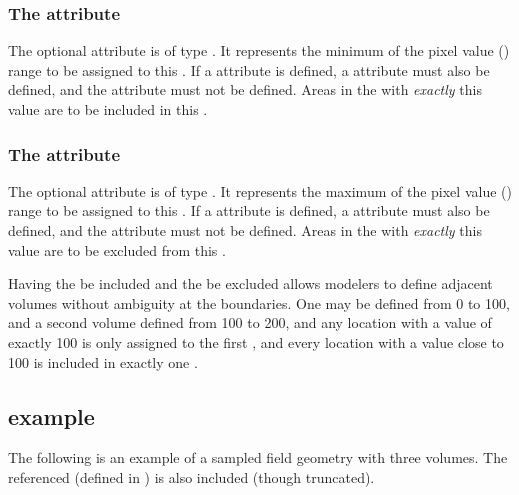 \subsubsection{The \fixttspace{} attribute}
The optional  attribute is of type . It represents the minimum of the pixel value () range to be assigned to this \SampledVolume.  If a  attribute is defined, a  attribute must also be defined, and the  attribute must not be defined.  Areas in the \SampledField with \emph{exactly} this value are to be included in this \SampledVolume.

\subsubsection{The \fixttspace{} attribute}
The optional  attribute is of type . It represents the maximum of the pixel value () range to be assigned to this \SampledVolume.  If a  attribute is defined, a  attribute must also be defined, and the  attribute must not be defined.  Areas in the \SampledField with \emph{exactly} this value are to be excluded from this \SampledVolume.

Having the  be included and the  be excluded allows modelers to define adjacent volumes without ambiguity at the boundaries.  One \SampledVolume may be defined from 0 to 100, and a second volume defined from 100 to 200, and any location with a \SampledField value of exactly 100 is only assigned to the first \SampledVolume, and every location with a value close to 100 is included in exactly one \SampledVolume.


\subsection{\SampledFieldGeometry example}
\label{sampledfieldgeometry-example}
The following is an example of a sampled field geometry with three volumes.  The referenced \SampledField (defined in ) is also included (though truncated).

